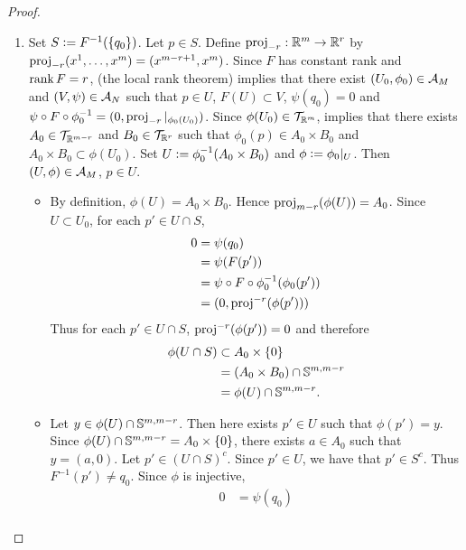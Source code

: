 \documentclass{book}
\begin{document}
	\begin{proof}\
		\begin{enumerate}
			\item Set $S \defeq F^{-1}(\{q_0\})$. Let $p \in S$. Define $\prj_{-r}: \R^m \rightarrow \R^{r}$ by $\prj_{-r}(x^1, \ldots, x^m) = (x^{m-r+1}, x^{m})$. Since $F$ has constant rank and $\rnk F = r$,  (the local rank theorem)  implies that there exist $(U_0, \phi_0) \in \MA_M$ and $(V, \psi) \in \MA_N$ such that $p \in U$, $F(U) \subset V$, $\psi(q_0) = 0$ and $\psi \circ F \circ \phi_0^{-1} = (0, \prj_{-r}|_{\phi_0(U_0)})$. Since $\phi(U_0) \in \MT_{\R^m}$,  implies that there exists $A_0 \in \MT_{\R^{m-r}}$ and $B_0 \in \MT_{\R^{r}}$ such that $\phi_0(p) \in A_0 \times B_0$ and $A_0 \times B_0 \subset \phi(U_0)$. Set $U \defeq \phi_0^{-1}(A_0 \times B_0)$ and $\phi \defeq \phi_0|_U$. Then $(U, \phi) \in \MA_M$, $p \in U$. 
			\begin{itemize}
				\item By definition, $\phi(U) = A_0 \times B_0$. Hence $\prj_{m-r}(\phi(U)) = A_0$. Since $U \subset U_0$, for each $p' \in U \cap S$, 
				\begin{align*}
					0
					& = \psi(q_0) \\
					& = \psi(F(p')) \\
					& = \psi \circ F \circ \phi_0^{-1}(\phi_0(p')) \\
					& = (0, \prj^{-r}(\phi(p')))
				\end{align*}
				Thus for each $p' \in U \cap S$, $\prj^{-r}(\phi(p')) = 0$ and therefore 
				\begin{align*}
					\phi(U \cap S) 
					& \subset A_0 \times \{0\} \\
					& = (A_0 \times B_0) \cap \S^{m, m-r} \\
					& = \phi(U) \cap \S^{m, m-r}.
				\end{align*}
				\item Let $y \in \phi(U) \cap \S^{m, m-r}$. Then here exists $p' \in U$ such that $\phi(p') = y$. Since  $\phi(U) \cap \S^{m, m-r} = A_0 \times \{0\}$, there exists $a \in A_0$ such that $y = (a, 0)$. Let $p' \in (U \cap S)^c$. Since $p' \in U$, we have that $p' \in S^c$. Thus $F^{-1}(p') \neq q_0$. Since $\phi$ is injective, 
				\begin{align*}
					0
					& = \psi(q_0) \\

\end{align*}
\end{itemize}
\end{enumerate}
\end{proof}
\end{document}
